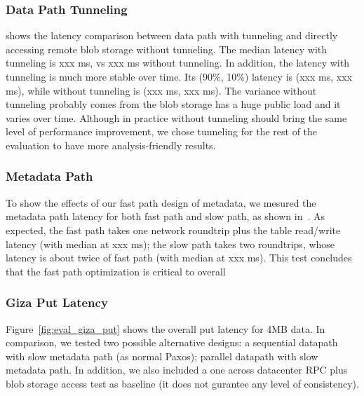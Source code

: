 \subsubsection{Data Path Tunneling}

 shows the latency comparison between data path with tunneling and 
directly accessing remote blob storage without tunneling. The median latency with tunneling 
is xxx ms, vs xxx ms without tunneling. In addition, the latency with tunneling is much 
more stable over time. Its (90\%, 10\%) latency is (xxx ms, xxx ms), while without tunneling 
is (xxx ms, xxx ms). The variance without tunneling probably comes from the blob storage 
has a huge public load and it varies over time. Although in practice \name without tunneling 
should bring the same level of performance improvement, we chose tunneling for the rest of 
the evaluation to have more analysis-friendly results.

\subsubsection{Metadata Path}

To show the effects of our fast path design of metadata, we mesured the metadata path latency 
for both fast path and slow path, as shown in~. As expected, the fast 
path takes one network roundtrip plus the table read/write latency (with median at xxx ms); 
the slow path takes two roundtrips, whose latency is about twice of fast path (with median at 
xxx ms). This test concludes that the fast path optimization is critical to \name overall 


\subsubsection{Giza Put Latency}


Figure~\ref{fig:eval_giza_put} shows the \name overall put latency for 4MB data. In comparison, 
we tested two possible alternative designs: a sequential datapath with slow metadata 
path (as normal Paxos); parallel datapath with slow metadata path. In addition, we also 
included a one across datacenter RPC plus blob storage access test as baseline (it does 
not gurantee any level of consistency).


